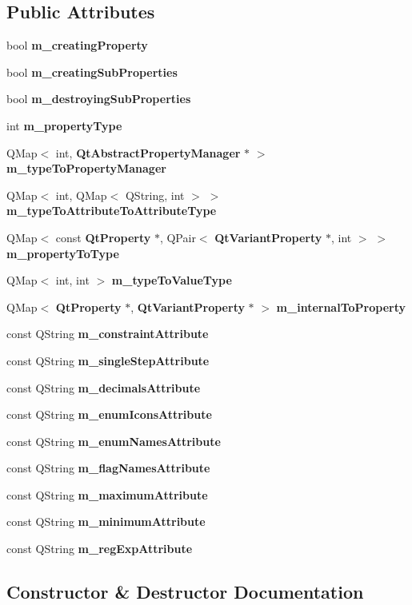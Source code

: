 \subsection*{Public Attributes}
\begin{DoxyCompactItemize}
\item 
bool {\bf m\+\_\+creating\+Property}
\item 
bool {\bf m\+\_\+creating\+Sub\+Properties}
\item 
bool {\bf m\+\_\+destroying\+Sub\+Properties}
\item 
int {\bf m\+\_\+property\+Type}
\item 
Q\+Map$<$ int, {\bf Qt\+Abstract\+Property\+Manager} $\ast$ $>$ {\bf m\+\_\+type\+To\+Property\+Manager}
\item 
Q\+Map$<$ int, Q\+Map$<$ Q\+String, int $>$ $>$ {\bf m\+\_\+type\+To\+Attribute\+To\+Attribute\+Type}
\item 
Q\+Map$<$ const {\bf Qt\+Property} $\ast$, Q\+Pair$<$ {\bf Qt\+Variant\+Property} $\ast$, int $>$ $>$ {\bf m\+\_\+property\+To\+Type}
\item 
Q\+Map$<$ int, int $>$ {\bf m\+\_\+type\+To\+Value\+Type}
\item 
Q\+Map$<$ {\bf Qt\+Property} $\ast$, {\bf Qt\+Variant\+Property} $\ast$ $>$ {\bf m\+\_\+internal\+To\+Property}
\item 
const Q\+String {\bf m\+\_\+constraint\+Attribute}
\item 
const Q\+String {\bf m\+\_\+single\+Step\+Attribute}
\item 
const Q\+String {\bf m\+\_\+decimals\+Attribute}
\item 
const Q\+String {\bf m\+\_\+enum\+Icons\+Attribute}
\item 
const Q\+String {\bf m\+\_\+enum\+Names\+Attribute}
\item 
const Q\+String {\bf m\+\_\+flag\+Names\+Attribute}
\item 
const Q\+String {\bf m\+\_\+maximum\+Attribute}
\item 
const Q\+String {\bf m\+\_\+minimum\+Attribute}
\item 
const Q\+String {\bf m\+\_\+reg\+Exp\+Attribute}
\end{DoxyCompactItemize}


\subsection{Constructor \& Destructor Documentation}
